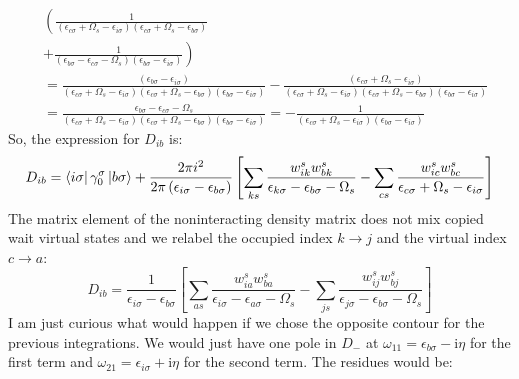\documentclass[12pt]{article}
\begin{document}
\begin{equation}
\begin{aligned}
& \left( \frac{1}{(\epsilon_{c \sigma} + \Omega_s -\epsilon_{i \sigma})(\epsilon_{c \sigma} + \Omega_s -\epsilon_{b \sigma})} \right. \\
& \left. + \frac{1}{(\epsilon_{b \sigma} -\epsilon_{c \sigma}-\Omega_s)(\epsilon_{b \sigma} -\epsilon_{i \sigma})} \right) \\
& = \frac{\left( \epsilon_{b\sigma } - \epsilon_{i\sigma } \right)}{\left(\epsilon_{c\sigma } + \Omega _s - \epsilon_{i\sigma}\right)\left(\epsilon_{c\sigma } + \Omega _s - \epsilon_{b\sigma}\right)\left(\epsilon_{b\sigma } - \epsilon_{i\sigma}\right)} - \frac{\left(\epsilon _{c \sigma} + \Omega _s - \epsilon _{i\sigma } \right)}{\left(\epsilon _{c \sigma} + \Omega _s - \epsilon _{i\sigma}\right)\left(\epsilon _{c \sigma} + \Omega _s - \epsilon _{b\sigma}\right)\left(\epsilon _{b \sigma} - \epsilon _{i\sigma}\right)}\\
& = \frac{\epsilon _{b\sigma } - \epsilon _{c \sigma} - \Omega _s}{\left(\epsilon _{c \sigma} + \Omega _s - \epsilon _{i\sigma}\right)\left(\epsilon _{c \sigma} + \Omega _s - \epsilon _{b\sigma}\right)\left(\epsilon _{b \sigma} - \epsilon _{i\sigma}\right)} = - \frac{1}{\left(\epsilon _{c \sigma} + \Omega _s - \epsilon _{i\sigma}\right)\left(\epsilon _{b \sigma} - \epsilon _{i\sigma}\right)}
\end{aligned}
\end{equation}
So, the expression for $D_{ib}$ is:
\begin{equation}
D_{ib} = \bra{i\sigma } \gamma _0^\sigma \ket{b\sigma } + \frac{2\pi i^2}{2\pi\left( \epsilon _{i\sigma } - \epsilon _{b\sigma } \right)} \left[ \sum_{ks} \frac{w_{ik}^s w_{bk}^s}{\epsilon _{k\sigma } - \epsilon _{b\sigma } - \Omega _s} - \sum_{cs} \frac{w_{ic}^s w_{bc}^s}{\epsilon _{c \sigma} + \Omega _s - \epsilon _{i\sigma}} \right]
\end{equation}
The matrix element of the noninteracting density matrix does not mix copied wait virtual states and we relabel the occupied index $k\rightarrow j$ and the virtual index $c\rightarrow a$:
\begin{equation}
D_{ib} = \frac{1}{\epsilon _{i\sigma } - \epsilon _{b\sigma }} \left[ \sum_{as} \frac{w_{ia}^s w_{ba}^s}{\epsilon _{i\sigma } - \epsilon _{a\sigma } - \Omega _s} - \sum_{js} \frac{w_{ij}^s w_{bj}^s}{\epsilon _{j\sigma } - \epsilon _{b\sigma } - \Omega _s} \right]
\end{equation}
I am just curious what would happen if we chose the opposite contour for the previous integrations. We would just have one pole in $D_-$ at $\omega_{11} = \epsilon _{b \sigma } - \mathrm{i} \eta$ for the first term and $\omega_{21} = \epsilon _{i \sigma } + \mathrm{i} \eta$ for the second term. The residues would be:
\end{document}
